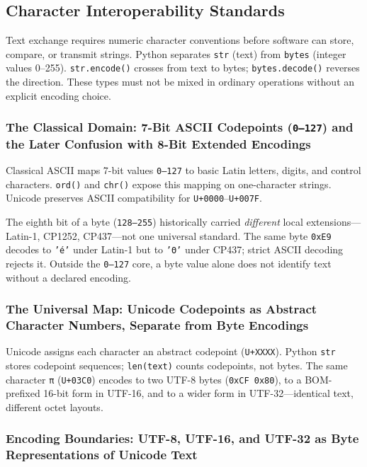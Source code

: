 \documentclass[a4paper,twoside]{report}
\begin{document}
\subsection{Character Interoperability Standards}

Text exchange requires numeric character conventions before software can store, compare, or transmit strings. Python separates \texttt{str} (text) from \texttt{bytes} (integer values 0--255). \texttt{str.encode()} crosses from text to bytes; \texttt{bytes.decode()} reverses the direction. These types must not be mixed in ordinary operations without an explicit encoding choice.

\subsubsection{The Classical Domain: 7-Bit ASCII Codepoints (\texttt{0--127}) and the Later Confusion with 8-Bit Extended Encodings}

Classical ASCII maps 7-bit values \texttt{0--127} to basic Latin letters, digits, and control characters. \texttt{ord()} and \texttt{chr()} expose this mapping on one-character strings. Unicode preserves ASCII compatibility for \texttt{U+0000}--\texttt{U+007F}.

The eighth bit of a byte (\texttt{128--255}) historically carried \emph{different} local extensions---Latin-1, CP1252, CP437---not one universal standard. The same byte \texttt{0xE9} decodes to \texttt{'é'} under Latin-1 but to \texttt{'Θ'} under CP437; strict ASCII decoding rejects it. Outside the \texttt{0--127} core, a byte value alone does not identify text without a declared encoding.

\subsubsection{The Universal Map: Unicode Codepoints as Abstract Character Numbers, Separate from Byte Encodings}

Unicode assigns each character an abstract codepoint (\texttt{U+XXXX}). Python \texttt{str} stores codepoint sequences; \texttt{len(text)} counts codepoints, not bytes. The same character \texttt{π} (\texttt{U+03C0}) encodes to two UTF-8 bytes (\texttt{0xCF 0x80}), to a BOM-prefixed 16-bit form in UTF-16, and to a wider form in UTF-32---identical text, different octet layouts.

\subsubsection{Encoding Boundaries: UTF-8, UTF-16, and UTF-32 as Byte Representations of Unicode Text}
\end{document}
